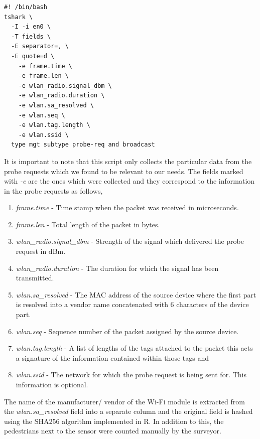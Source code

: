 \begin{verbatim}
#! /bin/bash
tshark \
  -I -i en0 \
  -T fields \
  -E separator=, \
  -E quote=d \
    -e frame.time \
    -e frame.len \
    -e wlan_radio.signal_dbm \
    -e wlan_radio.duration \
    -e wlan.sa_resolved \
    -e wlan.seq \
    -e wlan.tag.length \
    -e wlan.ssid \
  type mgt subtype probe-req and broadcast
\end{verbatim}

It is important to note that this script only collects the particular data from the probe requests which we found to be relevant to our needs. 
The fields marked with \textit{-e} are the ones which were collected and they correspond to the information in the probe requests as follows,

\begin{enumerate}[rightmargin = 0.5em, leftmargin = 0.5em]
  \itemsep-0.25em
  \item \textit{frame.time} - Time stamp when the packet was received in microseconds.
  \item \textit{frame.len} - Total length of the packet in bytes.
  \item \textit{wlan\_radio.signal\_dbm} - Strength of the signal which delivered the probe request in dBm.
  \item \textit{wlan\_radio.duration} - The duration for which the signal has been transmitted.
  \item \textit{wlan.sa\_resolved} - The MAC address of the source device where the first part is resolved into a vendor name concatenated with 6 characters of the device part.
  \item \textit{wlan.seq} - Sequence number of the packet assigned by the source device.
  \item \textit{wlan.tag.length} - A list of lengths of the tags attached to the packet this acts a signature of the information contained within those tags and
  \item \textit{wlan.ssid} - The network for which the probe request is being sent for. This information is optional.
\end{enumerate}

The name of the manufacturer/ vendor of the Wi-Fi module  is extracted from the \textit{wlan.sa\_resolved} field into a separate column and the original field is hashed using the SHA256 algorithm \cite{gueron2011} implemented in R.
In addition to this, the pedestrians next to the sensor were counted manually by the surveyor.

